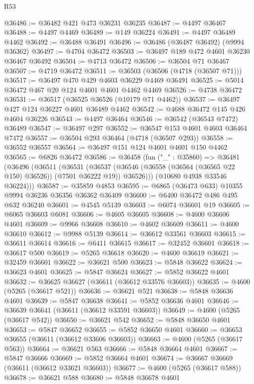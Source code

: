 \begin{lexlean}{R53}
\begin{coremodule}
@36486 := @36482 @421 @473 @36231 @36235
@36487 := @4497 @36467
@36488 := @4497 @4469
@36489 := @149 @36224
@36491 := @4497 @36489 @4462
@36492 := @36488 @36491
@36496 := @36486 (@36487 @36492) (@9994 @36362)
@36497 := @4704 @36472
@36503 := @36497 @189 @472 @4601 @36230 @36467 @36492
@36504 := @4713 @36472
@36506 := @36504 @71 @36467
@36507 := @4719 @36472
@36511 := @36503 (@36506 (@4718 (@36507 @71)))
@36517 := @36497 @470 @429 @4603 @36229 @4469 @36491
@36525 := @5014 @36472 @467 @20 @124 @4601 @4601 @4462 @4469
@36526 := @4738 @36472
@36531 := @36517 (@36525 @36526 (@10179 @71 @4462))
@36537 := @36497 @427 @124 @36227 @4601 @36489 @4462
@36542 := @4688 @36472 @145 @426 @4604 @36226
@36543 := @4497 @36464
@36546 := @36542 (@36543 @7472) @36489
@36547 := @36497 @297
@36552 := @36547 @153 @4601 @4603 @36464 @7472
@36557 := @36504 @293 @36464 (@4718 (@36507 @293))
@36558 := @36552 @36557
@36564 := @36497 @151 @124 @4601 @4601 @150 @4462
@36565 := @6826 @36472
@36586 := @36458
    (fun ("_" : @35860) =>
    @36481
      (@36496
        (@36511
          (@36531
            (@36537 (@36546 (@36558 (@36564 (@36565 @22 @150) @36526)) (@7501 @36222 @19)) @36526)))
        (@10680 @4938 @33546 @36224)))
@36587 := @35859 @4853
@36595 := @6865 (@36473 @633) @10355 @9994 @36236 @36356 @36362 @36409
@36600 := @6400 @36472 @486 @495 @632 @36240
@36601 := @4545 @5139
@36603 := @6074 @36601 @19
@36605 := @6065 @36603 @6081
@36606 := @4605 @36605
@36608 := @4600 @36606 @4601
@36609 := @9966 @36608
@36610 := @4602 @36609
@36611 := @4600 @36610
@36612 := @9988 @5139
@36614 := @36612 @33561 @36603
@36615 := @36611 @36614
@36616 := @6411 @36615
@36617 := @32452 @36601
@36618 := @36617 @500
@36619 := @5265 @36618
@36620 := @4600 @36619
@36621 := @32459 @36601
@36622 := @36621 @500
@36623 := @5848 @36622
@36624 := @36623 @4601
@36625 := @5847 @36624
@36627 := @5852 @36622 @4601
@36632 := @36625 @36627 (@36611 (@36612 @33576 @36603))
@36635 := @4600 (@5265 (@36617 @521))
@36636 := @36621 @521
@36638 := @5848 @36636 @4601
@36639 := @5847 @36638
@36641 := @5852 @36636 @4601
@36646 := @36639 @36641 (@36611 (@36612 @33591 @36603))
@36649 := @4600 (@5265 (@36617 @542))
@36650 := @36621 @542
@36652 := @5848 @36650 @4601
@36653 := @5847 @36652
@36655 := @5852 @36650 @4601
@36660 := @36653 @36655 (@36611 (@36612 @33606 @36603))
@36663 := @4600 (@5265 (@36617 @563))
@36664 := @36621 @563
@36666 := @5848 @36664 @4601
@36667 := @5847 @36666
@36669 := @5852 @36664 @4601
@36674 := @36667 @36669 (@36611 (@36612 @33621 @36603))
@36677 := @4600 (@5265 (@36617 @588))
@36678 := @36621 @588
@36680 := @5848 @36678 @4601

\end{coremodule}
\end{lexlean}
